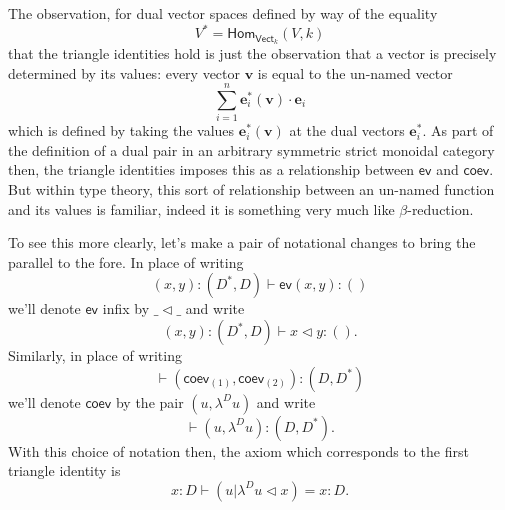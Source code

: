 \documentclass[pra,floatfix,
amsmath,superscriptaddress, 12pt]{article}
\theoremstyle{definition}
\newcommand{\evmap}{\mathsf{ev}}
\newcommand{\coev}{\mathsf{coev}}
\begin{document}
\par

The observation, for dual vector spaces defined by way of the equality \[
V^*=\mathsf{Hom}_{\mathsf{Vect}_k}\left(V,k \right)
\]
that the triangle identities hold is just the observation that a vector is precisely determined by its values: every vector $\mathbf{v}$  is equal to the un-named vector
\[
\sum_{i=1}^{n}\mathbf{e}_i^*\left( \mathbf{v}\right)\cdot \mathbf{e}_i
\]
which is defined by taking the values $\mathbf{e}^*_{i}\left( \mathbf{v} \right)$ at the dual vectors $\mathbf{e}_i^*$.
As part of the definition of a dual pair in an arbitrary symmetric strict monoidal category then, the triangle identities imposes this as a relationship between $\evmap$ and $\coev$. But within type theory, this sort of relationship between an un-named function and its values is familiar, indeed it is something very much like $\beta$-reduction.

\par To see this more clearly, let's make a pair of notational changes
to bring the parallel to the fore. In place of writing 
\[
\left(x,y\right):\left(D^{*},D\right)\vdash\evmap\left(x,y\right):\left(\right)
\]
we'll denote $\evmap$ infix by $\_\triangleleft\_$ and write
\[
\left(x,y\right):\left(D^{*},D\right)\vdash x\triangleleft y:\left(\right).
\]
Similarly, in place of writing 
\[
\vdash\left(\coev_{\left(1\right)},\coev_{\left(2\right)}\right):\left(D,D^{*}\right)
\]
 we'll denote $\coev$ by the pair $\left(u,\lambda^{D}u\right)$
and write
\[
\vdash\left(u,\lambda^{D}u\right):\left(D,D^{*}\right).
\]
With this choice of notation then, the axiom which corresponds to
the first triangle identity is 
\[
x:D\vdash\left( u | \lambda^{D}u\triangleleft x\right)=x:D.
\]

\par
\end{document}
